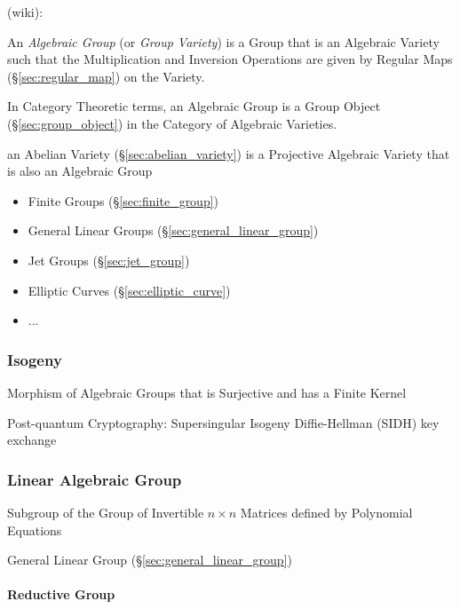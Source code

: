(wiki):

An \emph{Algebraic Group} (or \emph{Group Variety}) is a Group that is an
Algebraic Variety such that the Multiplication and Inversion Operations are
given by Regular Maps (\S\ref{sec:regular_map}) on the Variety.

In Category Theoretic terms, an Algebraic Group is a Group Object
(\S\ref{sec:group_object}) in the Category of Algebraic Varieties.

\fist an Abelian Variety (\S\ref{sec:abelian_variety}) is a Projective Algebraic
Variety that is also an Algebraic Group

\begin{itemize}
  \item Finite Groups (\S\ref{sec:finite_group})
  \item General Linear Groups (\S\ref{sec:general_linear_group})
  \item Jet Groups (\S\ref{sec:jet_group})
  \item Elliptic Curves (\S\ref{sec:elliptic_curve})
  \item ...
\end{itemize}



\subsubsection{Isogeny}\label{sec:isogeny}

Morphism of Algebraic Groups that is Surjective and has a Finite Kernel

Post-quantum Cryptography: Supersingular Isogeny Diffie-Hellman (SIDH) key
exchange



\subsubsection{Linear Algebraic Group}\label{sec:linear_algebraic_group}

Subgroup of the Group of Invertible $n \times n$ Matrices defined by Polynomial
Equations

General Linear Group (\S\ref{sec:general_linear_group})



\paragraph{Reductive Group}\label{sec:reductive_group}\hfill



